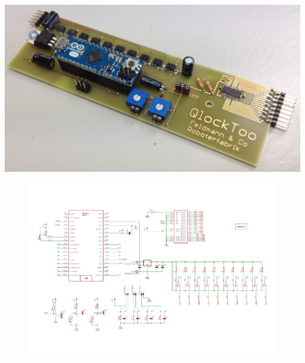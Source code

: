 {
\centering 
\includegraphics[width=\textwidth]{Abbildungen/Elektronik/Platine_bestueckt} 
}


\begin{landscape}
	\begin{figure}[H]
		\centering
		\includegraphics[width=22cm]{Abbildungen/QlockToo_Schaltplan}
		
	\end{figure}
\end{landscape}
